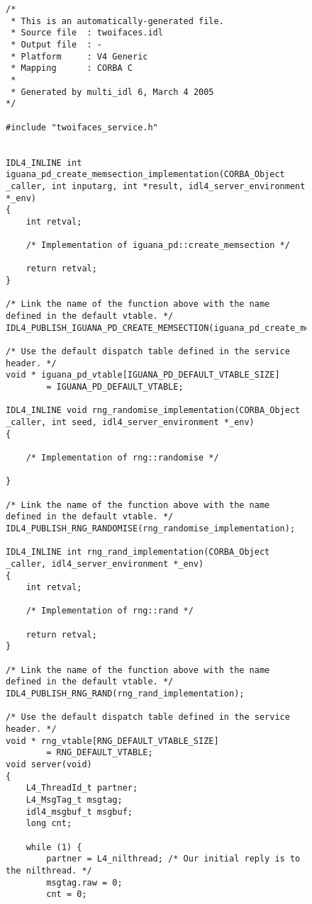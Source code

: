 \begin{figure}
\begin{verbatim}
/* 
 * This is an automatically-generated file.
 * Source file  : twoifaces.idl
 * Output file  : -
 * Platform     : V4 Generic
 * Mapping      : CORBA C
 *
 * Generated by multi_idl 6, March 4 2005
*/

#include "twoifaces_service.h"


IDL4_INLINE int iguana_pd_create_memsection_implementation(CORBA_Object _caller, int inputarg, int *result, idl4_server_environment *_env)
{
    int retval;

    /* Implementation of iguana_pd::create_memsection */

    return retval;
}

/* Link the name of the function above with the name defined in the default vtable. */
IDL4_PUBLISH_IGUANA_PD_CREATE_MEMSECTION(iguana_pd_create_memsection_implementation);

/* Use the default dispatch table defined in the service header. */
void * iguana_pd_vtable[IGUANA_PD_DEFAULT_VTABLE_SIZE]
        = IGUANA_PD_DEFAULT_VTABLE;

IDL4_INLINE void rng_randomise_implementation(CORBA_Object _caller, int seed, idl4_server_environment *_env)
{

    /* Implementation of rng::randomise */

}

/* Link the name of the function above with the name defined in the default vtable. */
IDL4_PUBLISH_RNG_RANDOMISE(rng_randomise_implementation);

IDL4_INLINE int rng_rand_implementation(CORBA_Object _caller, idl4_server_environment *_env)
{
    int retval;

    /* Implementation of rng::rand */

    return retval;
}

/* Link the name of the function above with the name defined in the default vtable. */
IDL4_PUBLISH_RNG_RAND(rng_rand_implementation);

/* Use the default dispatch table defined in the service header. */
void * rng_vtable[RNG_DEFAULT_VTABLE_SIZE]
        = RNG_DEFAULT_VTABLE;
void server(void)
{
    L4_ThreadId_t partner;
    L4_MsgTag_t msgtag;
    idl4_msgbuf_t msgbuf;
    long cnt;

    while (1) {
        partner = L4_nilthread; /* Our initial reply is to the nilthread. */
        msgtag.raw = 0;
        cnt = 0;


\end{verbatim}
\end{figure}
